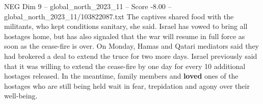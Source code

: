 \begin{textsample}{NEG Dim 9 – global\_north\_2023\_11 – Score -8.00 – global\_north\_2023\_11/103822087.txt}
The captives shared food with the militants, who kept conditions sanitary, she said.
Israel has vowed to bring all hostages home, but has also signaled that the war will resume in full force as soon as the cease-fire is over.
On Monday, Hamas and Qatari mediators said they had brokered a deal to extend the truce for two more days.
Israel previously said that it was willing to extend the cease-fire by one day for every 10 additional hostages released.
In the meantime, family members and \textbf{loved} ones of the hostages who are still being held wait in fear, trepidation and agony over their well-being.

\end{textsample}
